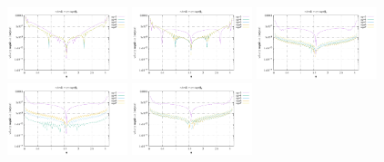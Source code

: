 \noindent
\includegraphics[width=3.5cm]{python_codes/fieldstone_152/RESULTS/exp1/vel_16_m2}
\includegraphics[width=3.5cm]{python_codes/fieldstone_152/RESULTS/exp1/vel_16_m3}
\includegraphics[width=3.5cm]{python_codes/fieldstone_152/RESULTS/exp1/vel_16_m4}
\includegraphics[width=3.5cm]{python_codes/fieldstone_152/RESULTS/exp1/vel_16_m5}
\includegraphics[width=3.5cm]{python_codes/fieldstone_152/RESULTS/exp1/vel_16_m6}

